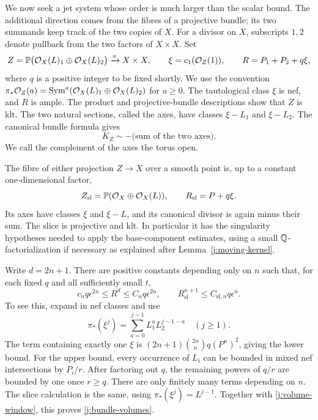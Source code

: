 We now seek a jet system whose order is much larger than the scalar
bound. The additional direction comes from the fibres of a
projective bundle; its two summands keep track of the two copies of
$X$. For a divisor on $X$, subscripts $1,2$ denote pullback from the
two factors of $X\times X$. Set
\begin{equation}\label{eq:bundle}
 Z=\mathbb P\bigl(\mathcal O_X(L)_1\oplus\mathcal O_X(L)_2\bigr)
       \xrightarrow{\pi}X\times X,
 \qquad \xi=c_1(\mathcal O_Z(1)),
 \qquad R=P_1+P_2+q\xi,
\end{equation}
where $q$ is a positive integer to be fixed shortly. We use the
convention
$\pi_*\mathcal O_Z(a)=\operatorname{Sym}^a(\mathcal O_X(L)_1\oplus\mathcal O_X(L)_2)$
for $a\ge0$. The tautological class $\xi$ is nef, and $R$ is ample.
The product and projective-bundle descriptions show that $Z$ is klt.
The two natural sections, called the axes, have classes
$\xi-L_1$ and $\xi-L_2$. The canonical bundle formula gives
\begin{equation}\label{j:axes-canonical}
                         K_Z\sim-\text{(sum of the two axes)}.
\end{equation}
We call the complement of the axes the torus open.

The fibre of either projection $Z\to X$ over a smooth point is,
up to a constant one-dimensional factor,
\[
 Z_{\mathrm{sl}}=\mathbb P(\mathcal O_X\oplus\mathcal O_X(L)),
 \qquad R_{\mathrm{sl}}=P+q\xi.
\]
Its axes have classes $\xi$ and $\xi-L$, and its canonical divisor
is again minus their sum. The slice is projective and klt. In
particular it has the singularity hypotheses needed to apply the
base-component estimates, using a small $\mathbb Q$-factorialization if
necessary as explained after Lemma~\ref{j:moving-kernel}.

Write $d=2n+1$. There are positive constants depending only on $n$
such that, for each fixed $q$ and all sufficiently small $t$,
\begin{equation}\label{j:bundle-volumes}
 c_nq\epsilon^{2n}\le R^d\le C_nq\epsilon^{2n},
 \qquad R_{\mathrm{sl}}^{n+1}\le C_{\mathrm{sl},n}q\epsilon^n.
\end{equation}
To see this, expand in nef classes and use
\[
 \pi_*(\xi^j)=\sum_{a=0}^{j-1}L_1^aL_2^{j-1-a}
 \quad(j\ge1).
\]
The term containing exactly one $\xi$ is
$(2n+1)\binom{2n}{n}q(P^n)^2$, giving the lower bound.
For the upper bound, every occurrence of $L_i$ can be bounded in
mixed nef intersections by $P_i/r$. After factoring out $q$, the
remaining powers of $q/r$ are bounded by one once $r\ge q$.
There are only finitely many terms depending on $n$. The slice
calculation is the same, using $\pi_*(\xi^j)=L^{j-1}$.
Together with \eqref{j:volume-window}, this proves
\eqref{j:bundle-volumes}.

